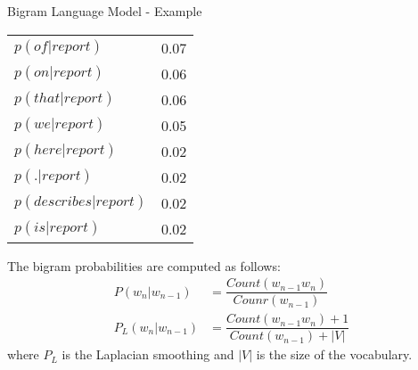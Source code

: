 \begin{frame}{Bigram Language Model - Example}
\begin{minipage}{0.32\linewidth}
\begin{tabular}{|lc|}
			$p( of | report )$ & 0.07 \\
			$p( on | report )$ & 0.06 \\
			$p( that | report )$ & 0.06 \\
			$p( we | report )$ & 0.05 \\
			$p( here | report )$ & 0.02 \\
			$p( . | report )$ & 0.02 \\
			$p( describes | report )$ & 0.02 \\
			$p( is | report )$ & 0.02 \\
			\hline
		\end{tabular}
	\end{minipage}

	The bigram probabilities are computed as follows:
	\begin{align}
		P(w_n|w_{n-1}) &= \dfrac{Count(w_{n-1}w_n)}{Counr(w_{n-1})}\\
		P_{L}(w_n|w_{n-1}) &= \dfrac{Count(w_{n-1}w_n) + 1}{Count(w_{n-1})+|V|}
	\end{align}
where $P_L$ is the Laplacian smoothing and $|V|$ is the size of the vocabulary.
\end{frame}

%
%
%

